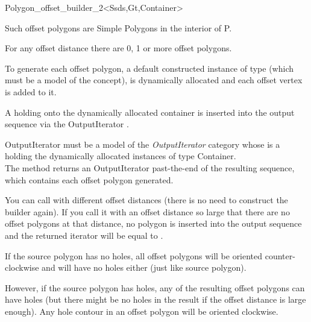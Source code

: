 \begin{ccRefClass}{Polygon_offset_builder_2<Ssds,Gt,Container>}
{Such offset polygons are Simple Polygons in the interior of P.

For any offset distance  there are 0, 1 or more offset polygons.

To generate each offset polygon, a default constructed instance of  type (which must be a model of the  concept), is dynamically allocated and each offset vertex is added to it.

A  holding onto the dynamically allocated container is inserted into the output sequence via the OutputIterator .

OutputIterator must be a model of the \textit{OutputIterator} category whose  is a  holding the dynamically allocated instances of type Container.\\
The method returns an OutputIterator past-the-end of the resulting sequence, which contains each offset polygon generated.

You can call  with different offset distances (there is no need to construct the builder  again). If you call it with an offset distance so large that there are no offset polygons at that distance, no polygon is inserted into the output sequence and the returned iterator will be equal to .

If the source polygon has no holes, all offset polygons will be oriented counter-clockwise and will have no holes either (just like source polygon).

However, if the source polygon has holes, any of the resulting offset polygons can have holes (but there might be no holes in the result if the offset distance is large enough). Any hole contour in an offset polygon will be oriented clockwise.}
  

\ccSeeAlso
{}\\
\\
\\
\end{ccRefClass}

